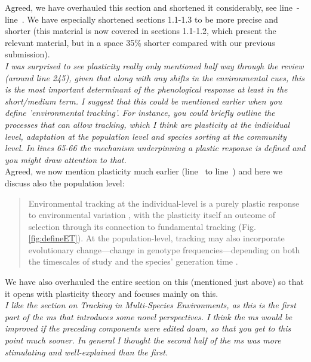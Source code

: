 \documentclass[11pt,letterpaper]{article}
\newcommand{\lr}[1]{line~\lineref{#1}}
\begin{document}
Agreed, we have overhauled this section and shortened it considerably, see \lr{plasS}-\lr{bhE}. We have especially shortened sections 1.1-1.3 to be more precise and shorter (this material is now covered in sections 1.1-1.2, which present the relevant material, but in a space 35\% shorter compared with our previous submission).\\

\emph{I was surprised to see plasticity really only mentioned half way through the review (around
line 245), given that along with any shifts in the environmental cues, this is the most
important determinant of the phenological response at least in the short/medium term. I
suggest that this could be mentioned earlier when you define 'environmental tracking'. For
instance, you could briefly outline the processes that can allow tracking, which I think are
plasticity at the individual level, adaptation at the population level and species sorting at
the community level.  In lines 65-66 the mechanism underpinning a plastic response is defined
and you might draw attention to that.}\\

Agreed, we now mention plasticity much earlier (\lr{Bminusbstart} to \lr{itsnotevo}) and here we discuss also the population level: 

\begin{quote}
 Environmental tracking at the individual-level is a purely plastic response to environmental variation \citep[in line with current findings on most climate change responses,][]{bonamour2019}, with the plasticity itself an outcome of selection \citep{chevin2010} through its connection to fundamental tracking (Fig. \ref{fig:defineET}). At the population-level, tracking may also incorporate evolutionary change---change in genotype frequencies---depending on both the timescales of study and the species' generation time \citep[this evolutionary response can be predicted as the difference between the environmental sensitivity of phenotypic selection and an organism's plasticity, $|B-b|$ in][]{chevin2010}.
\end{quote}
We have also overhauled the entire section on this (mentioned just above) so that it opens with plasticity theory and focuses mainly on this.\\

\emph{I like the section on Tracking in Multi-Species Environments, as this is the first part of
the ms that introduces some novel perspectives. I think the ms would be improved if the
preceding components were edited down, so that you get to this point much sooner. In general
I thought the second half of the ms was more stimulating and well-explained than the first.}\\
\end{document}
